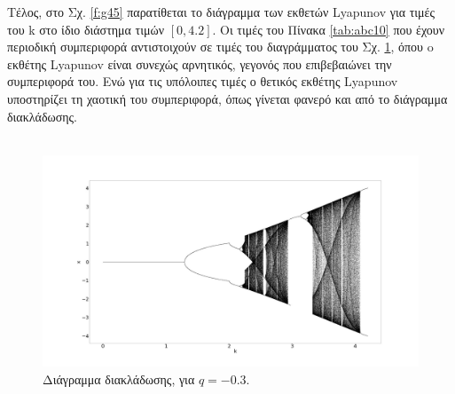 Τέλος, στο Σχ. \ref{f:g45} παρατίθεται το διάγραμμα των εκθετών Lyapunov για τιμές του k στο ίδιο διάστημα τιμών $[0, 4.2]$. Οι τιμές του Πίνακα \ref{tab:abc10} που έχουν περιοδική συμπεριφορά αντιστοιχούν σε τιμές του διαγράμματος του Σχ. \ref{f:g44}, όπου o εκθέτης Lyapunov είναι συνεχώς αρνητικός, γεγονός που επιβεβαιώνει την συμπεριφορά του. Ενώ για τις υπόλοιπες τιμές ο θετικός εκθέτης Lyapunov υποστηρίζει τη χαοτική του συμπεριφορά, όπως γίνεται φανερό και από το διάγραμμα διακλάδωσης.\\\\

\begin{figure}[ht]
	\centering
	\includegraphics[width=1\linewidth]{LateX images/sine q=-0.3/g1}
	\caption{Διάγραμμα διακλάδωσης, για $q=-0.3$.}
	\label{f:g44}
\end{figure}



